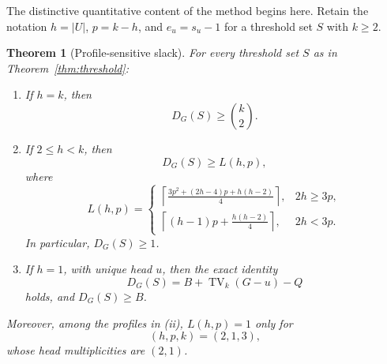 \documentclass[a4paper,11pt]{amsart}
\numberwithin{equation}{section}
\newtheorem{theorem}{Theorem}[section]
\theoremstyle{definition}
\theoremstyle{remark}
\newcommand{\TV}{\operatorname{TV}}
\begin{document}
The distinctive quantitative content of the method begins here.  Retain the notation $h=\lvert U\rvert$, $p=k-h$, and $e_u=s_u-1$ for a threshold set $S$ with $k\ge2$.

\begin{theorem}[Profile-sensitive slack]\label{thm:profile-slack}
For every threshold set $S$ as in Theorem~\ref{thm:threshold}:
\begin{enumerate}[label=\textup{(\roman*)}]
\item If $h=k$, then
\[
D_G(S)\ge\binom{k}{2}.
\]
\item If $2\le h<k$, then
\begin{equation}
D_G(S)\ge L(h,p),
\label{eq:D-L}
\end{equation}
where
\begin{equation}
L(h,p)=
\begin{cases}
\displaystyle
\left\lceil\frac{3p^2+(2h-4)p+h(h-2)}{4}\right\rceil,
&2h\ge3p,\\[10pt]
\displaystyle
\left\lceil(h-1)p+\frac{h(h-2)}{4}\right\rceil,
&2h<3p.
\end{cases}
\label{eq:def-L}
\end{equation}
In particular, $D_G(S)\ge1$.
\item If $h=1$, with unique head $u$, then the exact identity
\begin{equation}
D_G(S)=B+\TV_k(G-u)-Q
\label{eq:h1-exact}
\end{equation}
holds, and $D_G(S)\ge B$.
\end{enumerate}
Moreover, among the profiles in \textup{(ii)}, $L(h,p)=1$ only for
\begin{equation}
(h,p,k)=(2,1,3),
\label{eq:exceptional-profile}
\end{equation}
whose head multiplicities are $(2,1)$.
\end{theorem}
\end{document}
